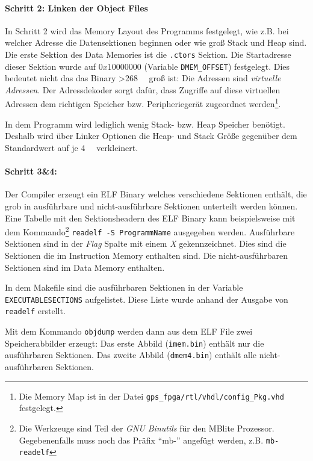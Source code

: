 \paragraph{Schritt 2: Linken der Object Files}
In Schritt 2 wird das Memory Layout des Programms festgelegt, wie z.B. bei welcher Adresse die Datensektionen beginnen oder wie groß Stack und Heap sind. Die erste Sektion des Data Memories ist die \lstinline$.ctors$ Sektion. Die Startadresse dieser Sektion wurde auf $0x10000000$ (Variable \lstinline$DMEM_OFFSET$) festgelegt. Dies bedeutet nicht das das Binary \SI{>268}{\mega\byte} groß ist: Die Adressen sind \emph{virtuelle Adressen}. Der Adressdekoder sorgt dafür, dass Zugriffe auf diese virtuellen Adressen dem richtigen Speicher bzw. Peripheriegerät zugeordnet werden\footnote{Die Memory Map ist in der Datei \lstinline$gps_fpga/rtl/vhdl/config_Pkg.vhd$ festgelegt.}.

In dem Programm wird lediglich wenig Stack- bzw. Heap Speicher benötigt. Deshalb wird über Linker Optionen die Heap- und Stack Größe gegenüber dem Standardwert auf je \SI{4}{\kilo\byte} verkleinert. 

\paragraph{Schritt 3\&4:}
Der Compiler erzeugt ein \gls{ELF} Binary welches verschiedene Sektionen enthält, die grob in ausführbare und nicht-ausführbare Sektionen unterteilt werden können. Eine Tabelle mit den Sektionsheadern des \gls{ELF} Binary kann beispielsweise mit dem Kommando\footnote{\label{MBBinutils}Die Werkzeuge sind Teil der \emph{GNU Binutils} für den MBlite Prozessor. Gegebenenfalls muss noch das Präfix \enquote{mb-} angefügt werden, z.B. \lstinline$mb-readelf$} \lstinline$readelf -S ProgrammName$ ausgegeben werden. Ausführbare Sektionen sind in der \emph{Flag} Spalte mit einem \emph{X} gekennzeichnet. Dies sind die Sektionen die im Instruction Memory enthalten sind. Die nicht-ausführbaren Sektionen sind im Data Memory enthalten.

In dem Makefile sind die ausführbaren Sektionen in der Variable \lstinline$EXECUTABLESECTIONS$ aufgelistet. Diese Liste wurde anhand der Ausgabe von \lstinline$readelf$ erstellt.

Mit dem Kommando \lstinline$objdump$ werden dann aus dem \gls{ELF} File zwei Speicherabbilder erzeugt: Das erste Abbild (\lstinline$imem.bin$) enthält nur die ausführbaren Sektionen. Das zweite Abbild (\lstinline$dmem4.bin$) enthält alle nicht-ausführbaren Sektionen.

